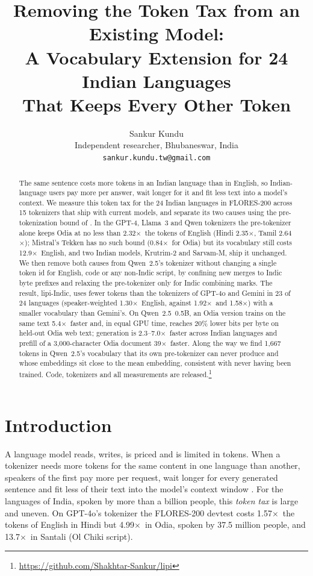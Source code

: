 \documentclass[11pt]{article}
\title{Removing the Token Tax from an Existing Model:\\A Vocabulary Extension for 24 Indian Languages\\That Keeps Every Other Token}
\author{Sankur Kundu \\
  Independent researcher, Bhubaneswar, India \\
  \texttt{sankur.kundu.tw@gmail.com}}
\newcommand{\x}{$\times$}
\begin{document}
\maketitle

\begin{abstract}
The same sentence costs more tokens in an Indian language than in English, so Indian-language users
pay more per answer, wait longer for it and fit less text into a model's context. We measure this
token tax for the 24 Indian languages in FLORES-200 across 15 tokenizers that ship with current
models, and separate its two causes using the pre-tokenization bound of \citet{regmi2026vowel}. In
the GPT-4, Llama~3 and Qwen tokenizers the pre-tokenizer alone keeps Odia at no less than 2.32\x\
the tokens of English (Hindi 2.35\x, Tamil 2.64\x); Mistral's Tekken has no such bound (0.84\x\ for Odia) but
its vocabulary still costs 12.9\x\ English, and two Indian models, Krutrim-2 and Sarvam-M, ship it
unchanged. We then remove both causes from Qwen~2.5's tokenizer without changing a single
token id for English, code or any non-Indic script, by confining new merges to Indic byte prefixes
and relaxing the pre-tokenizer only for Indic combining marks. The result, lipi-Indic, uses fewer
tokens than the tokenizers of GPT-4o and Gemini in 23 of 24 languages (speaker-weighted 1.30\x\
English, against 1.92\x\ and 1.58\x) with a smaller vocabulary than Gemini's. On Qwen~2.5~0.5B, an
Odia version trains on the same text 5.4\x\ faster and, in equal GPU time, reaches 20\% lower bits
per byte on held-out Odia web text; generation is 2.3--7.0\x\ faster across Indian languages and
prefill of a 3,000-character Odia document 39\x\ faster. Along the way we find 1,667 tokens in
Qwen~2.5's vocabulary that its own pre-tokenizer can never produce and whose embeddings sit close to
the mean embedding, consistent with never having been trained. Code, tokenizers and all measurements
are released.\footnote{\url{https://github.com/Shakhtar-Sankur/lipi}}
\end{abstract}

\section{Introduction}

A language model reads, writes, is priced and is limited in tokens. When a tokenizer needs more
tokens for the same content in one language than another, speakers of the first pay more per
request, wait longer for every generated sentence and fit less of their text into the model's
context window \citep{petrov2023unfairness,ahia2023allcost}. For the languages of India, spoken by
more than a billion people, this \emph{token tax} is large and uneven. On GPT-4o's tokenizer the
FLORES-200 devtest \citep{nllb2022} costs 1.57\x\ the tokens of English in Hindi but 4.99\x\ in Odia,
spoken by 37.5 million people, and 13.7\x\ in Santali (Ol Chiki script).
\end{document}
